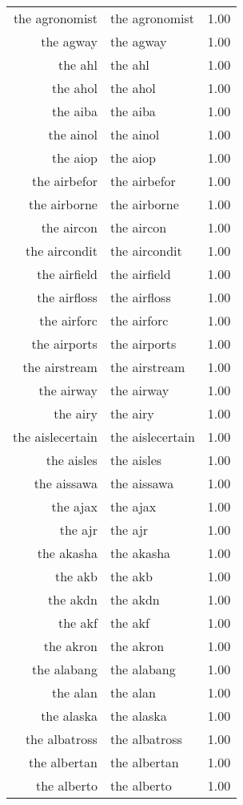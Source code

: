 \begin{table}[ht]
\begin{tabular}{rlr}
  the agronomist & the agronomist & 1.00 \\ 
  the agway & the agway & 1.00 \\ 
  the ahl & the ahl & 1.00 \\ 
  the ahol & the ahol & 1.00 \\ 
  the aiba & the aiba & 1.00 \\ 
  the ainol & the ainol & 1.00 \\ 
  the aiop & the aiop & 1.00 \\ 
  the airbefor & the airbefor & 1.00 \\ 
  the airborne & the airborne & 1.00 \\ 
  the aircon & the aircon & 1.00 \\ 
  the aircondit & the aircondit & 1.00 \\ 
  the airfield & the airfield & 1.00 \\ 
  the airfloss & the airfloss & 1.00 \\ 
  the airforc & the airforc & 1.00 \\ 
  the airports & the airports & 1.00 \\ 
  the airstream & the airstream & 1.00 \\ 
  the airway & the airway & 1.00 \\ 
  the airy & the airy & 1.00 \\ 
  the aislecertain & the aislecertain & 1.00 \\ 
  the aisles & the aisles & 1.00 \\ 
  the aissawa & the aissawa & 1.00 \\ 
  the ajax & the ajax & 1.00 \\ 
  the ajr & the ajr & 1.00 \\ 
  the akasha & the akasha & 1.00 \\ 
  the akb & the akb & 1.00 \\ 
  the akdn & the akdn & 1.00 \\ 
  the akf & the akf & 1.00 \\ 
  the akron & the akron & 1.00 \\ 
  the alabang & the alabang & 1.00 \\ 
  the alan & the alan & 1.00 \\ 
  the alaska & the alaska & 1.00 \\ 
  the albatross & the albatross & 1.00 \\ 
  the albertan & the albertan & 1.00 \\ 
  the alberto & the alberto & 1.00 \\ 

\end{tabular}
\end{table}
